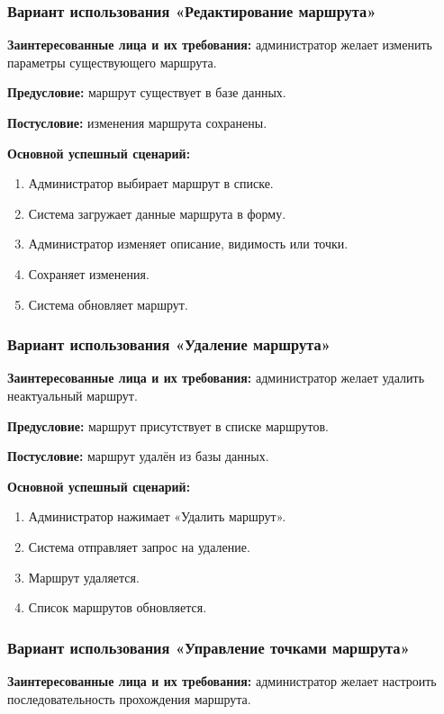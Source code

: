 \subsubsection{Вариант использования «Редактирование маршрута»}
\textbf{Заинтересованные лица и их требования:} администратор желает изменить параметры существующего маршрута.

\textbf{Предусловие:} маршрут существует в базе данных.

\textbf{Постусловие:} изменения маршрута сохранены.

\textbf{Основной успешный сценарий:}
\begin{enumerate}
	\item Администратор выбирает маршрут в списке.
	\item Система загружает данные маршрута в форму.
	\item Администратор изменяет описание, видимость или точки.
	\item Сохраняет изменения.
	\item Система обновляет маршрут.
\end{enumerate}

\subsubsection{Вариант использования «Удаление маршрута»}
\textbf{Заинтересованные лица и их требования:} администратор желает удалить неактуальный маршрут.

\textbf{Предусловие:} маршрут присутствует в списке маршрутов.

\textbf{Постусловие:} маршрут удалён из базы данных.

\textbf{Основной успешный сценарий:}
\begin{enumerate}
	\item Администратор нажимает «Удалить маршрут».
	\item Система отправляет запрос на удаление.
	\item Маршрут удаляется.
	\item Список маршрутов обновляется.
\end{enumerate}

\subsubsection{Вариант использования «Управление точками маршрута»}
\textbf{Заинтересованные лица и их требования:} администратор желает настроить последовательность прохождения маршрута.


